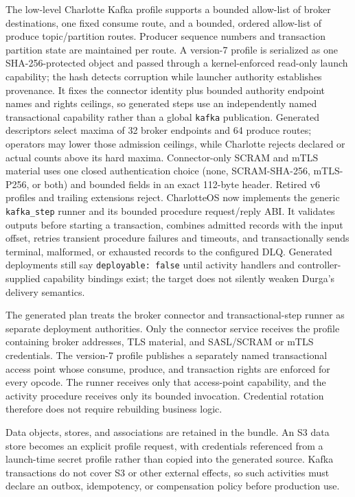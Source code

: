 The low-level Charlotte Kafka profile supports a bounded allow-list of broker
destinations, one fixed consume route, and a bounded, ordered allow-list of
produce topic/partition routes. Producer sequence numbers and transaction
partition state are maintained per route. A version-7 profile is serialized as
one SHA-256-protected object and passed through a kernel-enforced read-only
launch capability; the hash detects corruption while launcher authority
establishes provenance. It fixes the connector identity plus bounded authority
endpoint names and rights ceilings, so generated steps use an independently
named transactional capability rather than a global \texttt{kafka}
publication. Generated descriptors select maxima of 32 broker
endpoints and 64 produce routes; operators may lower those admission ceilings,
while Charlotte rejects declared or actual counts above its hard maxima.
Connector-only SCRAM and mTLS material uses one closed authentication choice
(none, SCRAM-SHA-256, mTLS-P256, or both) and bounded fields in an exact
112-byte header. Retired v6 profiles and trailing extensions reject.
CharlotteOS now implements the generic \texttt{kafka\_step} runner and its
bounded procedure request/reply ABI. It validates outputs before starting a
transaction, combines admitted records with the input offset, retries transient
procedure failures and timeouts, and transactionally sends terminal, malformed,
or exhausted records to the configured DLQ. Generated deployments still say
\texttt{deployable: false} until activity handlers and controller-supplied
capability bindings exist; the target does not silently weaken Durga's delivery
semantics.

The generated plan treats the broker connector and transactional-step runner
as separate deployment authorities. Only the connector service receives the
profile containing broker addresses, TLS material, and SASL/SCRAM or mTLS
credentials. The version-7 profile publishes a separately named transactional
access point whose consume, produce, and transaction rights are enforced for
every opcode. The runner receives only that access-point capability, and the
activity procedure receives only its bounded invocation.
Credential rotation therefore does not require rebuilding business logic.

Data objects, stores, and associations are retained in the bundle. An S3 data
store becomes an explicit profile request, with credentials referenced from a
launch-time secret profile rather than copied into the generated source. Kafka
transactions do not cover S3 or other external effects, so such activities must
declare an outbox, idempotency, or compensation policy before production use.

